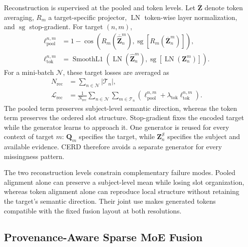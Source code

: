 \documentclass[a4paper,fleqn]{cas-dc}
\begin{document}
Reconstruction is supervised at the pooled and token levels. Let \(\overline{\mathbf Z}\) denote token averaging, \(R_m\) a target-specific projector, \(\operatorname{LN}\) token-wise layer normalization, and \(\operatorname{sg}\) stop-gradient. For target \((n,m)\),
\begin{equation}
\begin{aligned}
\ell_{\mathrm{pool}}^{n,m}
 &=1-\cos\!\left(R_m(\overline{\widehat{\mathbf Z}}_n^m),
 \operatorname{sg}[R_m(\overline{\mathbf Z}_n^m)]\right),\\
\ell_{\mathrm{tok}}^{n,m}
 &=\operatorname{SmoothL1}\!\left(
 \operatorname{LN}(\widehat{\mathbf Z}_n^m),
 \operatorname{sg}[\operatorname{LN}(\mathbf Z_n^m)]\right).
\end{aligned}
\label{eq:reconstruction_terms}
\end{equation}
For a mini-batch \(\mathcal N\), these target losses are averaged as
\begin{equation}
\begin{aligned}
N_{\mathrm{rec}}
  &=\sum_{n\in\mathcal N}|\mathcal T_n|,\\
\mathcal L_{\mathrm{rec}}
  &=\frac{1}{N_{\mathrm{rec}}}
    \sum_{n\in\mathcal N}\sum_{m\in\mathcal T_n}
    \left(\ell_{\mathrm{pool}}^{n,m}
    +\lambda_{\mathrm{tok}}\ell_{\mathrm{tok}}^{n,m}\right).
\end{aligned}
\label{eq:reconstruction_loss}
\end{equation}
The pooled term preserves subject-level semantic direction, whereas the token term preserves the ordered slot structure. Stop-gradient fixes the encoded target while the generator learns to approach it. One generator is reused for every context of target \(m\): \(\mathbf Q_m\) specifies the target, while \(\mathbf Z_n^{\mathcal S}\) specifies the subject and available evidence. CERD therefore avoids a separate generator for every missingness pattern.

The two reconstruction levels constrain complementary failure modes. Pooled alignment alone can preserve a subject-level mean while losing slot organization, whereas token alignment alone can reproduce local structure without retaining the target's semantic direction. Their joint use makes generated tokens compatible with the fixed fusion layout at both resolutions.

\subsection{Provenance-Aware Sparse MoE Fusion}
\label{sec:sparse_moe}
\end{document}
